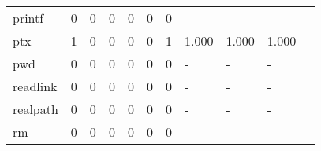 \begin{longtable}{lp{1.2cm}p{1.2cm}p{1.2cm}p{1.2cm}p{1.2cm}p{1.2cm}p{1.2cm}p{1.2cm}p{1.2cm}p{1.2cm}}
printf    &                                     0 &                                                  0 &                                                  0 &                                                  0 &                                                  0 &                                                  0 &                                                  - &                                                  - &                                                  - \\
ptx       &                                     1 &                                                  0 &                                                  0 &                                                  0 &                                                  0 &                                                  1 &                                              1.000 &                                              1.000 &                                              1.000 \\
pwd       &                                     0 &                                                  0 &                                                  0 &                                                  0 &                                                  0 &                                                  0 &                                                  - &                                                  - &                                                  - \\
readlink  &                                     0 &                                                  0 &                                                  0 &                                                  0 &                                                  0 &                                                  0 &                                                  - &                                                  - &                                                  - \\
realpath  &                                     0 &                                                  0 &                                                  0 &                                                  0 &                                                  0 &                                                  0 &                                                  - &                                                  - &                                                  - \\
rm        &                                     0 &                                                  0 &                                                  0 &                                                  0 &                                                  0 &                                                  0 &                                                  - &                                                  - &                                                  - \\

\end{longtable}
